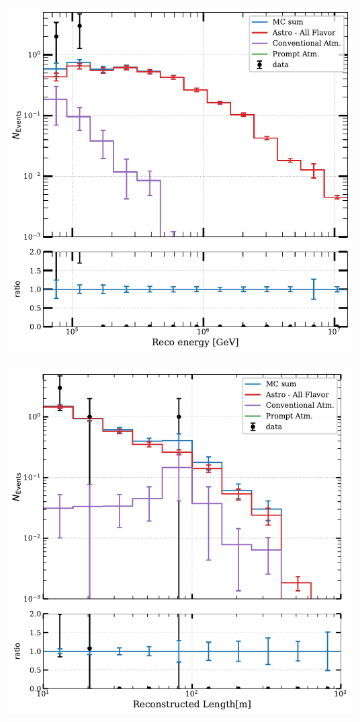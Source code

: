 \begin{figure}[h]
    \begin{subfigure}[h]{0.7\textwidth}
        \includegraphics{./figures/results/DataMC_IC86_pass2_SnowStorm_v2_Bfr_DoubleCascades_energy.pdf}
    \end{subfigure}
    \hfill
    \begin{subfigure}[h]{0.7\textwidth}
        \includegraphics{./figures/results/DataMC_IC86_pass2_SnowStorm_v2_Bfr_DoubleCascades_zenith.pdf}
       

\end{subfigure}
\end{figure}
